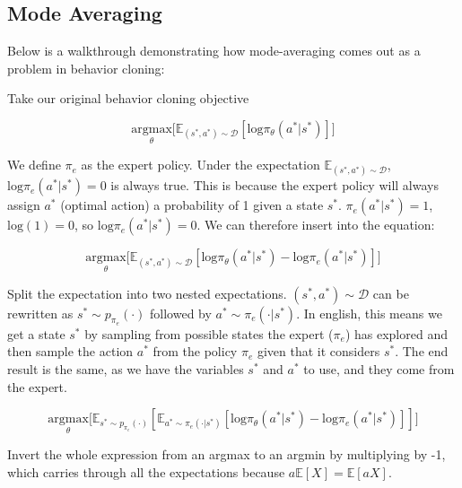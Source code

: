 
\subsection{Mode Averaging}
\begin{flushleft}
    \large Below is a walkthrough demonstrating how mode-averaging comes out as a problem in behavior cloning: \break

    Take our original behavior cloning objective

    $$\underset{\theta}{\textrm{argmax}}\biggl[\mathbb{E}_{(s^\ast,a^\ast) \sim \mathcal{D}}[\mathrm{log}\pi_\theta(a^\ast|s^\ast)]\biggr]$$

    We define $\pi_e$ as the expert policy. Under the expectation $\mathbb{E}_{(s^\ast,a^\ast) \sim \mathcal{D}}$, $\mathrm{log}\pi_e(a^\ast|s^\ast) = 0$ is always true. This is because the expert policy will always assign $a^\ast$ (optimal action) a probability of 1 given a state $s^\ast$. $\pi_e(a^\ast|s^\ast) = 1$, $\mathrm{log}(1) = 0$, so  $\mathrm{log}\pi_e(a^\ast|s^\ast) = 0$. We can therefore insert into the equation:

    $$\underset{\theta}{\textrm{argmax}}\biggl[\mathbb{E}_{(s^\ast,a^\ast) \sim \mathcal{D}}[\mathrm{log}\pi_\theta(a^\ast|s^\ast) - \mathrm{log}\pi_e(a^\ast|s^\ast)]\biggr]$$

    Split the expectation into two nested expectations. $(s^\ast,a^\ast) \sim \mathcal{D}$ can be rewritten as $s^\ast \sim p_{\pi_e}(\cdot)$ followed by $a^\ast \sim \pi_e(\cdot|s^\ast)$. In english, this means we get a state $s^\ast$ by sampling from possible states the expert ($\pi_e$) has explored and then sample the action $a^\ast$ from the policy $\pi_e$ given that it considers $s^\ast$. The end result is the same, as we have the variables $s^\ast$ and $a^\ast$ to use, and they come from the expert.

    $$\underset{\theta}{\textrm{argmax}}\biggl[\mathbb{E}_{s^\ast \sim p_{\pi_e}(\cdot)}[\mathbb{E}_{a^\ast \sim \pi_e(\cdot|s^\ast)}[\mathrm{log}\pi_\theta(a^\ast|s^\ast) - \mathrm{log}\pi_e(a^\ast|s^\ast)]]\biggr]$$

    Invert the whole expression from an argmax to an argmin by multiplying by -1, which carries through all the expectations because $a\mathbb{E}[X] = \mathbb{E}[aX]$.


\end{flushleft}

